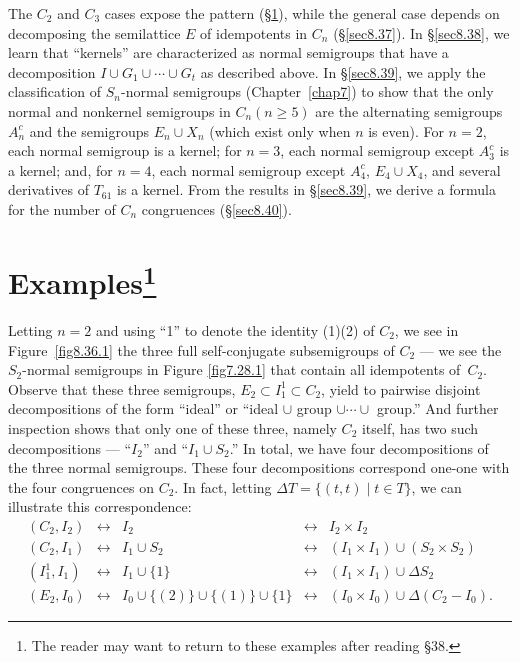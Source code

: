 \documentclass{surv-l}
\numberwithin{equation}{section}
\numberwithin{table}{section}
\numberwithin{figure}{section}
\theoremstyle{plain}
\theoremstyle{definition}
\begin{document}
The $C_{2}$ and $C_{3}$ cases expose the pattern
(\S\ref{sec8.36}), while the general case depends on decomposing
the semilattice $E$ of idempotents in $C_{n}$ (\S\ref{sec8.37}).
In \S\ref{sec8.38}, we learn that ``kernels'' are characterized as
normal semigroups that have a decomposition $I \cup
G_{1}\cup\cdots\cup G_{t}$ as described above. In \S\ref{sec8.39},
we apply the classification of $S_{n}$-normal semigroups
(Chapter~\ref{chap7}) to show that the only normal and nonkernel
semigroups in $C_{n} (n\geq 5)$ are the alternating semigroups
$A_{n}^{c}$ and the semigroups $E_{n}\cup X_{n}$ (which exist only
when $n$ is even). For $n =2$, each normal semigroup is a kernel;
for $n =3$, each normal semigroup except $A_{3}^{c}$ is a kernel;
and, for $n =4$, each normal semigroup except $A_{4}^{c}$,
$E_{4}\cup X_{4}$, and several derivatives of $T_{61}$ is a kernel.
From the results in \S\ref{sec8.39}, we derive a formula for the
number of $C_{n}$ congruences (\S\ref{sec8.40}).

\setcounter{section}{35}

\section[Examples]{Examples\protect\footnote{The reader may want to return to these
examples after reading \S38.}}\label{sec8.36}

Letting $n =2$ and using ``1'' to
denote the identity (1)(2) of $C_{2}$, we see in
Figure~\ref{fig8.36.1} the three full self-conjugate subsemigroups
of $C_{2}$ --- we see the $S_{2}$-normal semigroups in Figure
\ref{fig7.28.1} that contain all idempotents of~$C_{2}$.
 Observe that these three semigroups, $E_{2}\subset
I_{1}^{1}\subset C_{2}$, yield to pairwise disjoint decompositions
of the form ``ideal'' or ``ideal $\cup$ group $\cup\cdots\cup$
group.'' And further inspection shows that only one of these
three, namely $C_{2}$ itself, has two such decompositions ---
``$I_{2}$'' and ``$I_{1}\cup S_{2}$.'' In total, we have four
decompositions of the three normal semigroups. These four
decompositions correspond one-one with the four congruences on
$C_{2}$. In fact, letting $\Delta T= \{(t, t)\mid t\in
T\}$, we can illustrate this correspondence:
\[
\begin{array}{ccccc}
(C_{2}, I_{2}) &\leftrightarrow &I_{2} &\leftrightarrow &I_{2}\times I_{2} \\
(C_{2}, I_{1}) &\leftrightarrow &I_{1}\cup S_{2} &\leftrightarrow &(I_{1}\times I_{1})\cup(S_{2}\times S_{2})\\
(I_{1}^{1}, I_{1}) &\leftrightarrow &I_{1}\cup\{1\} &\leftrightarrow &(I_{1}\times I_{1})\cup\Delta S_{2}\\
(E_{2}, I_{0}) &\leftrightarrow &I_{0}\cup\{(2)\}\cup\{(1)\}\cup\{1\} &\leftrightarrow &(I_{0}\times I_{0})\cup\Delta(C_{2}-I_{0}).
\end{array}
\]
\end{document}
